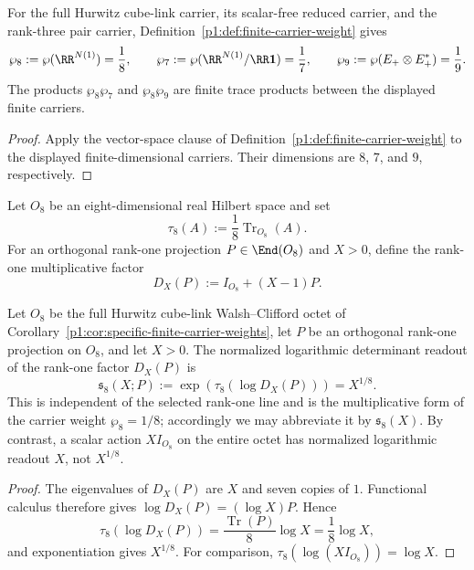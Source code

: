 \documentclass[11pt]{article}
\begin{document}
\begin{corollary}
\label{p1:cor:specific-finite-carrier-weights}
For the full Hurwitz cube-link carrier, its scalar-free reduced carrier, and
the rank-three pair carrier, Definition~\ref{p1:def:finite-carrier-weight} gives
\[
    \wp_8:=\wp(\RR^{N(1)})=\frac18,
    \qquad
    \wp_7:=\wp(\RR^{N(1)}/\RR\mathbf 1)=\frac17,
    \qquad
    \wp_9:=\wp(E_+\otimes E_+^{*})=\frac19.
\]
The products \(\wp_8\wp_7\) and \(\wp_8\wp_9\) are finite trace products
between the displayed finite carriers.
\end{corollary}

\begin{proof}
Apply the vector-space clause of
Definition~\ref{p1:def:finite-carrier-weight} to the displayed
finite-dimensional carriers.  Their dimensions are \(8\), \(7\), and \(9\),
respectively.
\end{proof}

\begin{definition}
\label{p1:def:normalized-octet-boundary-model}
Let \(O_8\) be an eight-dimensional real Hilbert space and set
\[
   \tau_8(A):=\frac1{8}\operatorname{Tr}_{O_8}(A).
\]
For an orthogonal rank-one projection \(P\in\End(O_8)\) and \(X>0\), define
the rank-one multiplicative factor
\[
   D_X(P):=I_{O_8}+(X-1)P.
\]
\end{definition}

\begin{proposition}
\label{p1:prop:octet-resolved-multiplicative-substep}
Let \(O_8\) be the full Hurwitz cube-link Walsh--Clifford octet of
Corollary~\ref{p1:cor:specific-finite-carrier-weights}, let \(P\) be an
orthogonal rank-one projection on \(O_8\), and let \(X>0\).  The normalized
logarithmic determinant readout of the rank-one factor \(D_X(P)\) is
\[
    \mathfrak s_8(X;P)
    :=
    \exp\!\left(\tau_8(\log D_X(P))\right)
    =
    X^{1/8}.
\]
This is independent of the selected rank-one line and is the multiplicative
form of the carrier weight \(\wp_8=1/8\); accordingly we may abbreviate it by
\(\mathfrak s_8(X)\).  By contrast, a scalar action
\(XI_{O_8}\) on the entire octet has normalized logarithmic readout \(X\), not
\(X^{1/8}\).

\end{proposition}

\begin{proof}
The eigenvalues of \(D_X(P)\) are \(X\) and seven copies of \(1\).
Functional calculus therefore gives \(\log D_X(P)=(\log X)P\).  Hence
\[
   \tau_8(\log D_X(P))
   =\frac{\operatorname{Tr}(P)}8\log X
   =\frac18\log X,
\]
and exponentiation gives \(X^{1/8}\).  For comparison,
\(\tau_8(\log(XI_{O_8}))=\log X\).
\end{proof}
\end{document}
